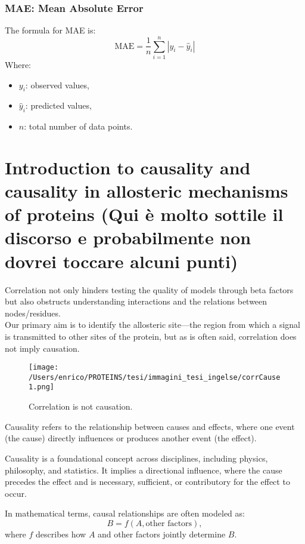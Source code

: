 \documentclass[English, Lau, oneside]{sapthesis}
\begin{document}
\subsection*{MAE: Mean Absolute Error}
\noindent The formula for MAE is:
\[
\text{MAE} = \frac{1}{n} \sum_{i=1}^n |y_i - \hat{y}_i|
\]
Where:
\begin{itemize}
    \item \(y_i\): observed values,
    \item \(\hat{y}_i\): predicted values,
    \item \(n\): total number of data points.
\end{itemize}

\newpage
\chapter{Introduction to causality and causality in allosteric mechanisms of proteins (Qui è molto sottile il discorso e probabilmente non dovrei toccare alcuni punti)}

\noindent Correlation not only hinders testing the quality of models through beta factors but also obstructs understanding interactions and the relations between nodes/residues.\\
Our primary aim is to identify the allosteric site—the region from which a signal is transmitted to other sites of the protein, but as is often said, correlation does not imply causation.

\begin{figure}[h]
    \centering
    \texttt{[image: /Users/enrico/PROTEINS/tesi/immagini\_tesi\_ingelse/corrCause1.png]}    
    \caption{Correlation is not causation.}
    \label{fig:Correlation is not causation}
\end{figure}

Causality refers to the relationship between causes and effects, where one event (the cause) directly influences or produces another event (the effect). 

Causality is a foundational concept across disciplines, including physics, philosophy, and statistics. It implies a directional influence, where the cause precedes the effect and is necessary, sufficient, or contributory for the effect to occur.

In mathematical terms, causal relationships are often modeled as:\cite{ref14}
\[
B = f(A, \text{other factors}),
\]
where \( f \) describes how \( A \) and other factors jointly determine \( B \). 
\end{document}
